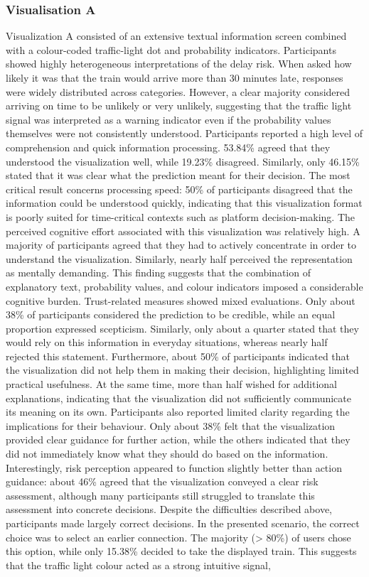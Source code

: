 \documentclass[final,journal,a4paper]{IEEEtran}
\begin{document}
\subsubsection{Visualisation A}
Visualization A consisted of an extensive textual information screen combined with a colour-coded traffic-light dot and probability indicators. Participants showed highly heterogeneous interpretations of the delay risk. When asked how likely it was that the train would arrive more than 30 minutes late, responses were widely distributed across categories. However, a clear majority considered arriving on time to be unlikely or very unlikely, suggesting that the traffic light signal was interpreted as a warning indicator even if the probability values themselves were not consistently understood. Participants reported a high level of comprehension and quick information processing. 53.84\% agreed that they understood the visualization well, while 19.23\% disagreed. Similarly, only 46.15\% stated that it was clear what the prediction meant for their decision. The most critical result concerns processing speed: 50\% of participants disagreed that the information could be understood quickly, indicating that this visualization format is poorly suited for time-critical contexts such as platform decision-making. The perceived cognitive effort associated with this visualization was relatively high. A majority of participants agreed that they had to actively concentrate in order to understand the visualization. Similarly, nearly half perceived the representation as mentally demanding. This finding suggests that the combination of explanatory text, probability values, and colour indicators imposed a considerable cognitive burden. Trust-related measures showed mixed evaluations. Only  about 38\% of participants considered the prediction to be credible, while an equal proportion expressed scepticism. Similarly, only about a quarter stated that they would rely on this information in everyday situations, whereas nearly half rejected this statement. Furthermore, about 50\% of participants indicated that the visualization did not help them in making their decision, highlighting limited practical usefulness. At the same time, more than half wished for additional explanations, indicating that the visualization did not sufficiently communicate its meaning on its own. Participants also reported limited clarity regarding the implications for their behaviour. Only about 38\% felt that the visualization provided clear guidance for further action, while the others indicated that they did not immediately know what they should do based on the information. Interestingly, risk perception appeared to function slightly better than action guidance: about 46\% agreed that the visualization conveyed a clear risk assessment, although many participants still struggled to translate this assessment into concrete decisions. Despite the difficulties described above, participants made largely correct decisions. In the presented scenario, the correct choice was to select an earlier connection. The majority (> 80\%) of users chose this option, while only 15.38\% decided to take the displayed train. This suggests that the traffic light colour acted as a strong intuitive signal, 
\end{document}
